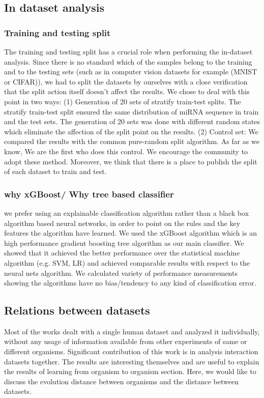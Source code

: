 \documentclass{bmcart}
\begin{document}
\subsection*{In dataset analysis}
\subsubsection*{Training and testing split} 
The training and testing split has a crucial role when performing the in-dataset analysis. Since there is no standard which of the samples belong to the training and to the testing sets (such as in computer vision datasets for example (MNIST or CIFAR)), we had to split the datasets by ourselves with a close verification that the split action itself doesn't affect the results. We chose to deal with this point in two ways: (1) Generation of 20 sets of stratify train-test splits. The stratify train-test split ensured the same distribution of miRNA sequence in train and the test sets. The generation of 20 sets was done with different random states which eliminate the affection of the split point on the results. (2) Control set: We compared the results with the common pure-random split algorithm. 
As far as we know, We are the first who does this control. We encourage the community to adopt these method. Moreover, we think that there is a place to publish the split of each dataset to train and test.

\subsubsection*{why xGBoost/ Why tree based classifier} 
we prefer using an explainable classification algorithm rather than a black box algorithm based neural networks, in order to point on the rules and the key features the algorithm have learned. We used the xGBoost algorithm which is an high performance gradient boosting tree algorithm as our main classifier. We showed that it achieved the better performance over the statistical machine algorithm (e.g. SVM, LR) and achieved comparable results with respect to the neural nets algorithm.
We calculated variety of performance measurements showing the algorithms have no bias/tendency to any kind of classification error. 

\subsection*{Relations between datasets}
Most of the works dealt with a single human dataset and analyzed it individually, without any usage of information available from other experiments of same or different organisms. Significant contribution of this work is in analysis interaction datasets together. The results are interesting themselves and are useful to explain the results of learning from organism to organism section. Here, we would like to discuss the evolution distance between organisms and the distance between datasets.
\end{document}
